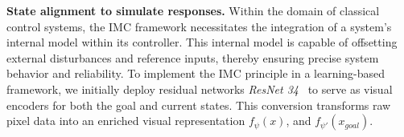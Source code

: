 \textbf{State alignment to simulate responses.}
Within the domain of classical control systems, the IMC framework necessitates the integration of a system's internal model within its controller. 
This internal model is capable of offsetting external disturbances and reference inputs, thereby ensuring precise system behavior and reliability.
To implement the IMC principle in a learning-based framework, we initially deploy residual networks \textit{ResNet 34}~\citep{he2016deep} to serve as visual encoders for both the goal and current states. 
This conversion transforms raw pixel data into an enriched visual representation $f_{\psi}(x)$, and $f_{\psi'}(x_{goal})$.
